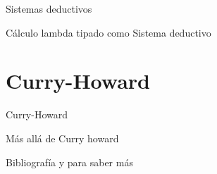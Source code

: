 \documentclass[usenames,dvipsnames]{beamer}
\begin{document}
\begin{frame}{Sistemas deductivos}

\end{frame}

\begin{frame}{Cálculo lambda tipado como Sistema deductivo}
  
\end{frame}
\section{Curry-Howard}

\begin{frame}{Curry-Howard}
  
\end{frame}

\begin{frame}{Más allá de Curry howard}

\end{frame}

\begin{frame}{Bibliografía y para saber más}

\end{frame}
\end{document}
